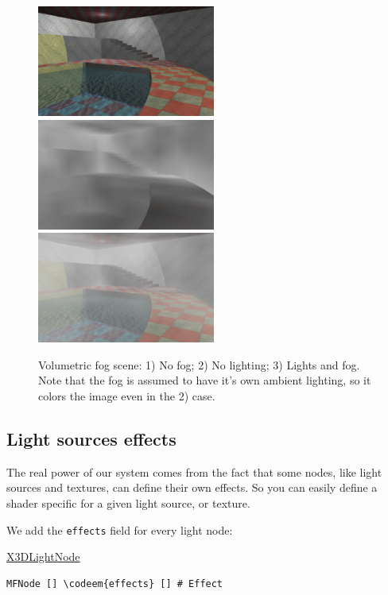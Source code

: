\documentclass{acmsiggraph}                     %
\newenvironment{mycode}
{\begin{mycodecore}}
{\end{mycodecore}
\vspace{-0.1in}}
\newcommand*{\codeem}[1]{\textbf{#1}}
\begin{document}
\begin{figure}[t]
  \centering
  \includegraphics[width=2.3in]{volumetric_animated_fog_no_fog}
  \includegraphics[width=2.3in]{volumetric_animated_fog_no_light}
  \includegraphics[width=2.3in]{volumetric_animated_fog_all}
  \caption{Volumetric fog scene: 1) No fog; 2) No lighting; 3) Lights and fog.
Note that the fog is assumed to have it's own ambient lighting,
so it colors the image even in the 2) case.}
\end{figure}

\subsection{Light sources effects}

The real power of our system comes from the fact that some nodes,
like light sources and textures, can define their own effects.
So you can easily define a shader specific for a given light source,
or texture.

We add the \texttt{effects} field for every light node:

\begin{mycode}
\underline{X3DLightNode}
\begin{Verbatim}[commandchars=\\\{\}]
MFNode [] \codeem{effects} [] # Effect
\end{Verbatim}
\end{mycode}
\end{document}
